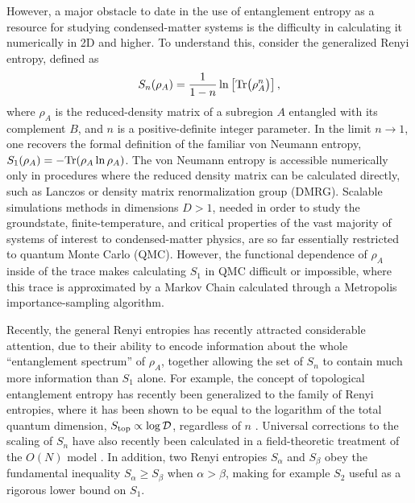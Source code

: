 \documentclass[prl,aps,twocolumn,floatfix,amsmath,amssymb,superscriptaddress,tightenlines]{revtex4}
\begin{document}
However, a major obstacle to date in the use of entanglement entropy as a resource for studying condensed-matter systems is 
the difficulty in calculating it numerically in 2D and higher.  To understand this, consider the generalized Renyi entropy, defined as 
\begin{equation}
S_{n} (\rho_A) = \frac{1}{1- n} \ln \left[{ {\rm Tr}\big( \rho_A^{n} \big) }\right],
\end{equation}
where $\rho_A$ is the reduced-density matrix of a subregion $A$ entangled with its complement $B$, and 
$n$ is a positive-definite integer parameter.  In the limit $n \rightarrow 1$, one recovers the formal 
definition of the familiar von Neumann entropy, $S_1 (\rho_A) = - {\rm Tr}( \rho_A \ln \rho_A )$.  The von Neumann entropy
is accessible numerically only in procedures where the reduced density matrix can be calculated directly, such as Lanczos 
or density matrix renormalization group (DMRG).  Scalable simulations methods in dimensions $D>1$, needed in order to study the groundstate, finite-temperature, and 
critical properties of the vast majority of systems of interest to condensed-matter physics, are so far essentially
restricted to quantum Monte Carlo (QMC).  However, the functional dependence of $\rho_A$ inside of the trace
makes calculating $S_1$ in QMC difficult or impossible, where this trace is approximated by a Markov Chain calculated
through a Metropolis importance-sampling algorithm. 

Recently, the general Renyi entropies has recently attracted considerable attention, due to their ability to encode
information about the whole ``entanglement spectrum'' of $\rho_A$, together allowing the set of $S_{n}$ to contain 
much more information than $S_1$ alone.  For example, the concept of topological entanglement entropy has recently been
generalized to the family of Renyi entropies, where it has been shown to be equal to the logarithm of the total quantum 
dimension, $S_{\rm top} \propto \log {\mathcal D}$, regardless of $n$ \cite{PI}.  Universal corrections to the scaling of $S_{n}$ 
have also recently been calculated in a field-theoretic treatment of the $O(N)$ model \cite{Max}.
In addition, two Renyi entropies $S_{\alpha}$ and $S_{\beta}$ obey the fundamental
inequality $S_{\alpha} \geq S_{\beta}$ when $\alpha > \beta$, making for example $S_2$ useful as a rigorous
lower bound on $S_1$.  
\end{document}
